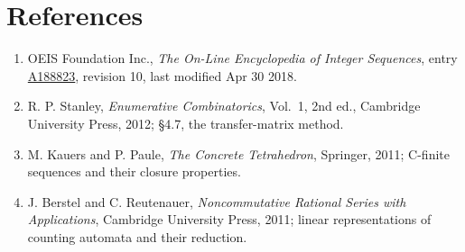 \documentclass[11pt]{article}
\theoremstyle{definition}
\begin{document}
\section{References}

\begin{enumerate}

\item OEIS Foundation Inc., \emph{The On-Line Encyclopedia of Integer Sequences}, entry \href{https://oeis.org/A188823}{A188823}, revision 10, last modified Apr 30 2018.

\item R. P. Stanley, \emph{Enumerative Combinatorics}, Vol.~1, 2nd ed., Cambridge University Press, 2012; \S4.7, the transfer-matrix method.

\item M. Kauers and P. Paule, \emph{The Concrete Tetrahedron}, Springer, 2011; C-finite sequences and their closure properties.

\item J. Berstel and C. Reutenauer, \emph{Noncommutative Rational Series with Applications}, Cambridge University Press, 2011; linear representations of counting automata and their reduction.

\end{enumerate}
\end{document}

